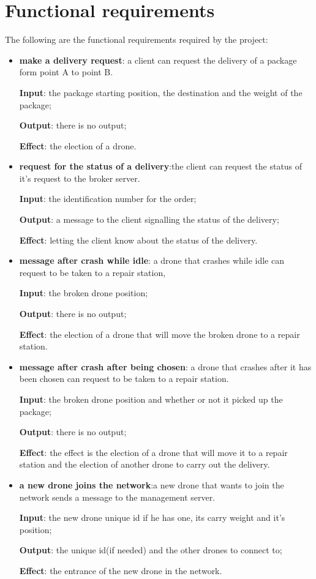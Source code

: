 \documentclass[a4paper, oneside]{memoir}
\begin{document}
\section{Functional requirements}


The following are the functional requirements required by the project:
\begin{itemize}
\item \textbf{make a delivery request}: a client can request the delivery of a package form point A to point B.

	\textbf{Input}: the package starting position, the destination and the weight of the package;

	\textbf{Output}: there is no output;

	\textbf{Effect}: the election of a drone.

\item \textbf{request for the status of a delivery}:the client can request the status of it's request to the broker server.

 	\textbf{Input}: the identification number for the order;

	\textbf{Output}: a message to the client signalling the status of the delivery;

	\textbf{Effect}: letting the client know about the status of the delivery.


\item \textbf{message after crash while idle}: a drone that crashes while idle can request to be taken to a repair station,

	\textbf{Input}: the broken drone position;

	\textbf{Output}: there is no output;

	\textbf{Effect}: the election of a drone that will move the broken drone to a repair station.

\item \textbf{message after crash after being chosen}: a drone that crashes after it has been chosen can request to be taken to a repair station.

	\textbf{Input}: the broken drone position and whether or not it picked up the package;

	\textbf{Output}: there is no output;

	\textbf{Effect}: the effect is the election of a drone that will move it to a repair station and the election of another drone to carry out the delivery.

\item \textbf{a new drone joins the network}:a new drone that wants to join the network sends a message to the management server.

	\textbf{Input}: the new drone unique id if he has one, its carry weight and it's position;

	\textbf{Output}: the unique id(if needed) and the other drones to connect to;

	\textbf{Effect}: the entrance of the new drone in the network.

\end{itemize}
\end{document}
